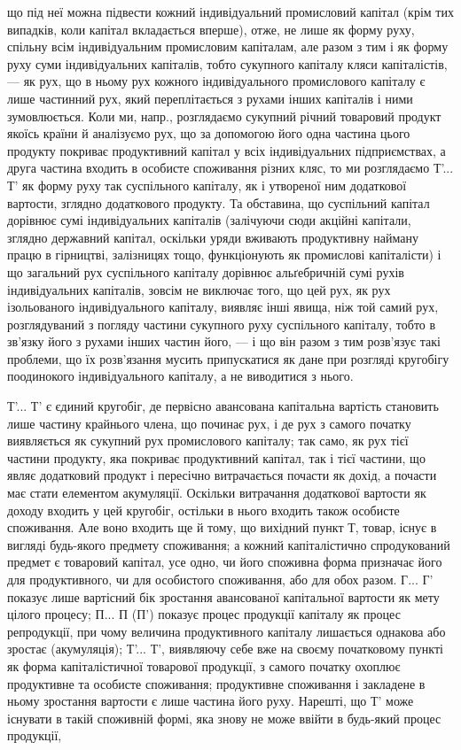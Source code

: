\parcont{}  %
що під неї можна підвести кожний індивідуальний промисловий капітал (крім тих випадків, коли капітал
вкладається вперше), отже, не лише як форму руху, спільну всім індивідуальним промисловим капіталам,
але разом з тим і як форму руху суми індивідуальних капіталів, тобто сукупного капіталу кляси
капіталістів, — як рух, що в ньому рух кожного індивідуального промислового капіталу є лише
частинний рух, який переплітається з рухами інших капіталів і ними зумовлюється. Коли ми, напр.,
розглядаємо сукупний річний товаровий продукт якоїсь країни й аналізуємо рух, що за допомогою його
одна частина цього продукту покриває продуктивний капітал у всіх індивідуальних підприємствах, а
друга частина входить в особисте споживання різних кляс, то ми розглядаємо Т'... Т' як форму руху
так суспільного капіталу, як і утвореної ним додаткової вартости, зглядно додаткового продукту. Та
обставина, що суспільний капітал дорівнює сумі індивідуальних капіталів (залічуючи сюди акційні
капітали, зглядно державний капітал, оскільки уряди вживають продуктивну найману працю в гірництві,
залізницях тощо, функціонують як промислові капіталісти) і що загальний рух суспільного капіталу
дорівнює альґебричній сумі рухів
індивідуальних капіталів, зовсім не виключає того, що цей рух, як рух ізольованого індивідуального
капіталу, виявляє інші явища, ніж той самий рух, розглядуваний з погляду частини сукупного руху
суспільного капіталу, тобто в зв’язку його з рухами інших частин його, — і що він разом з тим
розв’язує такі проблеми, що їх розв’язання мусить припускатися як дане при розгляді кругобігу
поодинокого індивідуального капіталу, а не виводитися з нього.

Т'... Т' є єдиний кругобіг, де первісно авансована капітальна вартість становить лише частину
крайнього члена, що починає рух, і де рух з самого початку виявляється як сукупний рух промислового
капіталу; так само, як рух тієї частини продукту, яка покриває продуктивний капітал, так і тієї
частини, що являє додатковий продукт і пересічно витрачається почасти як дохід, а почасти має стати
елементом акумуляції. Оскільки витрачання додаткової вартости як доходу входить у цей кругобіг,
остільки в нього входить також особисте споживання. Але воно входить ще й тому, що вихідний пункт Т,
товар, існує в вигляді будь-якого предмету споживання; а кожний капіталістично спродукований предмет
є товаровий капітал, усе одно, чи його споживна форма призначає його для продуктивного, чи для
особистого споживання, або для обох разом. Г... Г' показує лише вартісний бік зростання авансованої
капітальної вартости як мету цілого процесу; П... П (П') показує процес продукції капіталу як процес
репродукції, при чому величина продуктивного капіталу лишається однакова або зростає (акумуляція);
Т'... Т', виявляючу себе вже на своєму початковому пункті як форма капіталістичної товарової
продукції, з самого початку охоплює продуктивне та особисте споживання; продуктивне споживання і
закладене в ньому зростання вартости є лише частина його руху. Нарешті, що Т' може існувати в такій
споживній формі, яка знову не може ввійти в будь-який процес продукції,
\parbreak{}  %

